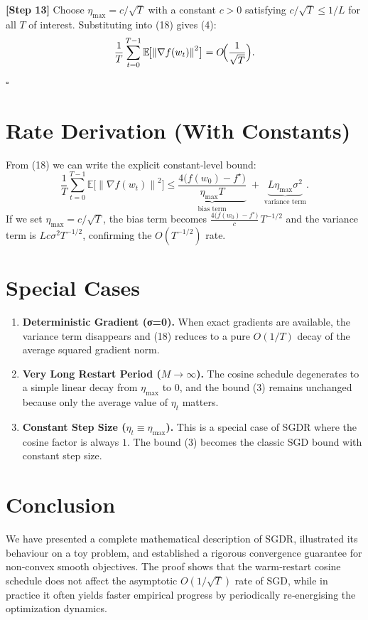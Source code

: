 \documentclass{article}
\newcommand{\E}{\mathbb{E}}
\newcommand{\norm}[1]{\left\lVert #1 \right\rVert}
\begin{document}
\noindent\textbf{[Step 13]} Choose $\eta_{\max}=c/\sqrt{T}$ with a constant
$c>0$ satisfying $c/\sqrt{T}\le 1/L$ for all $T$ of interest.  Substituting
into (18) gives (4):
\[
\frac{1}{T}\sum_{t=0}^{T-1}\E\!\bigl[\norm{\nabla f(w_t)}^{2}\bigr]
=O\!\Bigl(\frac{1}{\sqrt{T}}\Bigr).
\]
\hfill $\square$

\section*{Rate Derivation (With Constants)}
From (18) we can write the explicit constant‑level bound:
\[
\frac{1}{T}\sum_{t=0}^{T-1}\E\!\bigl[\norm{\nabla f(w_t)}^{2}\bigr]
\le
\underbrace{\frac{4\bigl(f(w_0)-f^{\star}\bigr)}{\eta_{\max}T}}_{\displaystyle
\text{bias term}}
\;+\;
\underbrace{L\eta_{\max}\sigma^{2}}_{\displaystyle\text{variance term}}.
\]
If we set $\eta_{\max}=c/\sqrt{T}$, the bias term becomes
$\frac{4\bigl(f(w_0)-f^{\star}\bigr)}{c}\,T^{-1/2}$ and the variance term
is $L c\sigma^{2}T^{-1/2}$, confirming the $O(T^{-1/2})$ rate.

\section*{Special Cases}
\begin{enumerate}[label=\alph*)]
\item \textbf{Deterministic Gradient (σ=0).}
When exact gradients are available, the variance term disappears and (18)
reduces to a pure $O(1/T)$ decay of the average squared gradient norm.
\item \textbf{Very Long Restart Period ($M\to\infty$).}
The cosine schedule degenerates to a simple linear decay from $\eta_{\max}$
to $0$, and the bound (3) remains unchanged because only the average value
of $\eta_t$ matters.
\item \textbf{Constant Step Size ($\eta_t\equiv\eta_{\max}$).}
This is a special case of SGDR where the cosine factor is always $1$.
The bound (3) becomes the classic SGD bound with constant step size.
\end{enumerate}

\section*{Conclusion}
We have presented a complete mathematical description of SGDR, illustrated its
behaviour on a toy problem, and established a rigorous convergence guarantee
for non‑convex smooth objectives.  The proof shows that the warm‑restart
cosine schedule does not affect the asymptotic $O(1/\sqrt{T})$ rate of SGD,
while in practice it often yields faster empirical progress by periodically
re‑energising the optimization dynamics.
\end{document}
